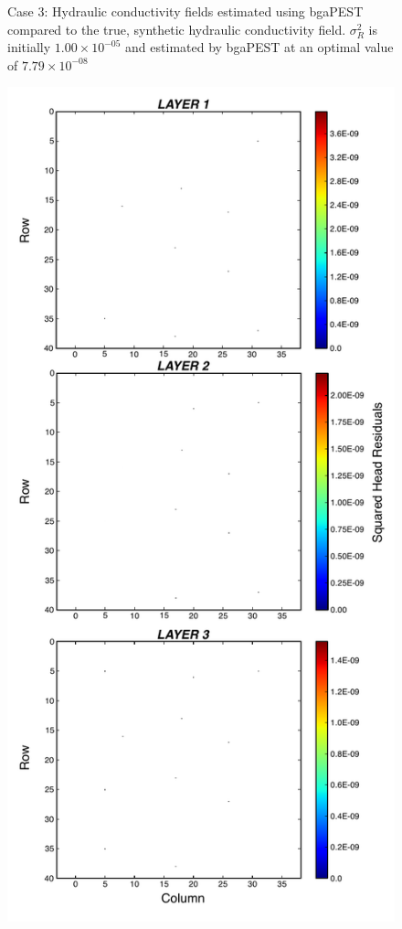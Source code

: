 \documentclass[11pt,oneside,onecolumn]{usgsreport}
\begin{document}
\begin{appendix}
\begin{figure}[!t]
\caption{\label{fig:3LK_case3}Case 3: Hydraulic conductivity fields estimated
using bgaPEST compared to the true, synthetic hydraulic conductivity
field. $\sigma_{R}^{2}$ is initially $1.00\times10^{-05}$ and estimated by bgaPEST at an optimal value of $7.79\times10^{-08}$}
\end{figure}


\begin{figure}[!t]
\begin{center}\includegraphics[scale=0.5]{figures/3L_resid_case3}\end{center}


\end{figure}
\end{appendix}
\end{document}
